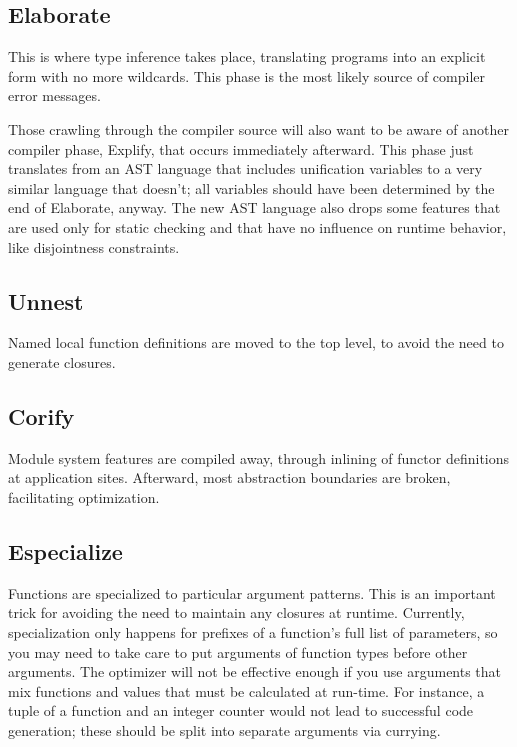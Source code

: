 \documentclass{article}
\begin{document}
\subsection{Elaborate}

This is where type inference takes place, translating programs into an explicit form with no more wildcards.  This phase is the most likely source of compiler error messages.

Those crawling through the compiler source will also want to be aware of another compiler phase, Explify, that occurs immediately afterward.  This phase just translates from an AST language that includes unification variables to a very similar language that doesn't; all variables should have been determined by the end of Elaborate, anyway.  The new AST language also drops some features that are used only for static checking and that have no influence on runtime behavior, like disjointness constraints.

\subsection{Unnest}

Named local function definitions are moved to the top level, to avoid the need to generate closures.

\subsection{Corify}

Module system features are compiled away, through inlining of functor definitions at application sites.  Afterward, most abstraction boundaries are broken, facilitating optimization.

\subsection{Especialize}

Functions are specialized to particular argument patterns.  This is an important trick for avoiding the need to maintain any closures at runtime.  Currently, specialization only happens for prefixes of a function's full list of parameters, so you may need to take care to put arguments of function types before other arguments.  The optimizer will not be effective enough if you use arguments that mix functions and values that must be calculated at run-time.  For instance, a tuple of a function and an integer counter would not lead to successful code generation; these should be split into separate arguments via currying.
\end{document}
